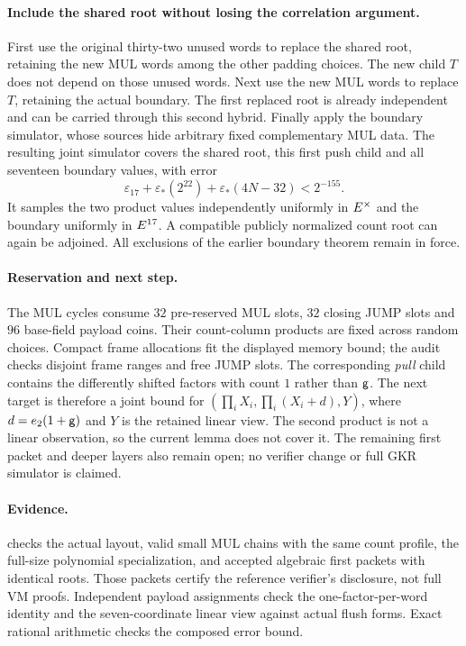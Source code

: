 \paragraph{Include the shared root without losing the correlation argument.} First use the original thirty-two unused words to replace the shared root, retaining the new MUL words among the other padding choices. The new child $T$ does not depend on those unused words. Next use the new MUL words to replace $T$, retaining the actual boundary. The first replaced root is already independent and can be carried through this second hybrid. Finally apply the boundary simulator, whose sources hide arbitrary fixed complementary MUL data. The resulting joint simulator covers the shared root, this first push child and all seventeen boundary values, with error
\[
 \varepsilon_{17}+\varepsilon_*(2^{22})+
 \varepsilon_*(4N-32)<2^{-155}.
\]
It samples the two product values independently uniformly in $E^\times$ and the boundary uniformly in $E^{17}$. A compatible publicly normalized count root can again be adjoined. All exclusions of the earlier boundary theorem remain in force.

\paragraph{Reservation and next step.} The MUL cycles consume $32$ pre-reserved MUL slots, $32$ closing JUMP slots and $96$ base-field payload coins. Their count-column products are fixed across random choices. Compact frame allocations fit the displayed memory bound; the audit checks disjoint frame ranges and free JUMP slots. The corresponding \emph{pull} child contains the differently shifted factors with count $1$ rather than $\mathsf{g}$. The next target is therefore a joint bound for $(\prod_iX_i,\prod_i(X_i+d),Y)$, where $d=e_2(1+\mathsf{g})$ and $Y$ is the retained linear view. The second product is not a linear observation, so the current lemma does not cover it. The remaining first packet and deeper layers also remain open; no verifier change or full GKR simulator is claimed.

\paragraph{Evidence.}  checks the actual layout, valid small MUL chains with the same count profile, the full-size polynomial specialization, and accepted algebraic first packets with identical roots. Those packets certify the reference verifier's disclosure, not full VM proofs. Independent payload assignments check the one-factor-per-word identity and the seven-coordinate linear view against actual flush forms. Exact rational arithmetic checks the composed error bound.

